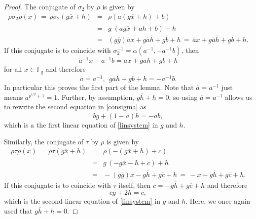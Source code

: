 \documentclass[10pt,a4paper]{amsart}
\begin{document}
\begin{proof}
The conjugate of $\sigma_2$ by $\rho$ is given by
\begin{equation}
\label{conjrho2}
\begin{array}{rcl}
\rho\sigma_2\rho(x)\,=\,\rho\sigma_2 (g\overline{x}+h)\!\!&=&\!\!\rho(a(g\overline{x}+h)+b)\\[.03in]
\!\!&=&\!\!g\;\overline{(ag\overline{x}+ah+b)}+h \\[.03in]
&=&\!\! (g\overline{g})\overline{a}x+g\overline{a}\overline{h}+g\overline{b} +h
\,=\,\overline{a}x+g\overline{a}\overline{h}+g\overline{b} +h.
\end{array} 
\end{equation}
If this conjugate is to coincide with $\sigma_2^{-1}=\alpha(a^{-1},-a^{-1}b)$, then 
\[a^{-1}x-a^{-1}b = \overline{a}x+g\overline{a}\overline{h}+g\overline{b} +h\]
for all $x\in\mathbb{F}_q$ and therefore
\begin{equation}
\label{consigma}
\overline{a}=a^{-1},\;\, g\overline{a}\overline{h}+g\overline{b} +h=-a^{-1}b.
\end{equation}
In particular this proves the first part of the lemma. Note that $\overline{a}=a^{-1}$ just means $a^{p^{l/2} +1}=1$. Further, by assumption, $g\overline{h}+h=0$, so using $\overline{a}=a^{-1}$ allows us to rewrite the second equation in \eqref{consigma} as 
\begin{equation}
\label{chireq1}
\overline{b}g +(1-\overline{a})h=-\overline{a}b,
\end{equation}
which is a the first linear equation of \eqref{linsystem} in $g$ and $h$.

Similarly, the conjugate of $\tau$ by $\rho$ is given by
\begin{equation}
\label{conjtau}
\begin{array}{rcl}
\rho\tau\rho(x)\,=\,\rho\tau(g\overline{x}+h)\!\!&=&\!\!\rho(-(g\overline{x}+h)+c)\\[.03in]
\!\!&=&\!\! g\,\overline{(-g\overline{x}-h+c)}+h \\[.03in]
&=&\!\!-(g\overline{g})x-\!g\overline{h}+g\overline{c} +h
\,=\,-x-g\overline{h}+g\overline{c} +h.
\end{array} 
\end{equation}
If this conjugate is to coincide with $\tau$ itself, then $c=-g\overline{h}+g\overline{c} +h$ and therefore 
\begin{equation}
\label{chireq2}
\overline{c}g + 2h = c,
\end{equation}
which is the second linear equation of \eqref{linsystem} in $g$ and $h$. Here, we once again used that $g\overline{h}+h=0$. 


\end{proof}
\end{document}
